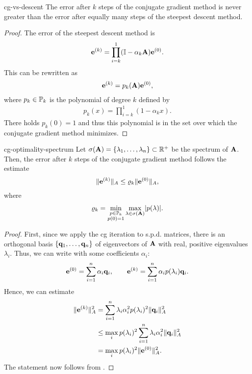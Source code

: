 \begin{Corollary}{cg-vs-descent}
  The error after $k$ steps of the conjugate gradient method is never
  greater than the error after equally many steps of the steepest
  descent method.
\end{Corollary}

\begin{proof}
  The error of the steepest descent method is
  \begin{gather}
    \ve^{(k)} = \prod_{i=k}^{1} (\id-\alpha_k\mata) \ve^{(0)}.
  \end{gather}
  This can be rewritten as
  \begin{gather}
    \ve^{(k)} = p_k(\mata) \ve^{(0)},
  \end{gather}
  where $p_k\in\P_k$ is the polynomial of degree $k$ defined by
  \begin{gather}
    p_k(x) = \prod_{i=k}^{1} (1-\alpha_kx).
  \end{gather}
  There holds $p_k(0)=1$ and thus this polynomial is in the set over
  which the conjugate gradient method minimizes.
\end{proof}

\begin{Corollary}{cg-optimality-spectrum}
  Let $\sigma(\mata) = \{\lambda_1,\dots,\lambda_n\} \subset \R^+$ be
  the spectrum of $\mata$. Then, the error after $k$ steps of the
  conjugate gradient method follows the estimate
  \begin{gather}
    \norm{\ve^{(k)}}_A \le \rho_k \norm{\ve^{(0)}}_A,
  \end{gather}
  where
  \begin{gather}
    \rho_k = \min_{\substack{p\in\P_k\\p(0) = 1}} \max_{\lambda\in\sigma(\mata)} \abs{p(\lambda)}.
  \end{gather}
\end{Corollary}

\begin{proof}
  First, since we apply the cg iteration to s.p.d. matrices, there is
  an orthogonal basis $\{\vq_1,\dots,\vq_n\}$ of eigenvectors of
  $\mata$ with real, positive eigenvalues $\lambda_i$. Thus, we can
  write with some coefficients $\alpha_i$:
  \begin{gather}
    \ve^{(0)} = \sum_{i=1}^n \alpha_i \vq_i,
    \qquad
    \ve^{(k)} = \sum_{i=1}^n \alpha_i p(\lambda_i) \vq_i.    
  \end{gather}
  Hence, we can estimate
  \begin{align}
    \norm{\ve^{(k)}}_A^2
    &= \sum_{i=1}^n \lambda_i\alpha_i^2 p(\lambda_i)^2 \norm{\vq_i}_A^2\\
    & \le \max_i p(\lambda_i)^2 \sum_{i=1}^n \lambda_i\alpha_i^2\norm{\vq_i}_A^2\\
    &= \max_i p(\lambda_i)^2 \norm{\ve^{(0)}}_A^2.
  \end{align}
  The statement now follows from .
\end{proof}

